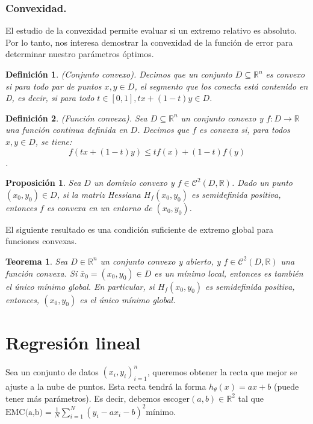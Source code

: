 \documentclass[a4paper,11pt]{article}
\newtheorem{theorem}{Teorema}
\newtheorem{proposition}{Proposición}
\newtheorem{definition}{Definición}
\begin{document}
\subsubsection{Convexidad.}

El estudio de la convexidad permite evaluar si un extremo relativo es absoluto. Por lo tanto, nos interesa demostrar la convexidad de la función de error para determinar nuestro parámetros óptimos.\\

\noindent
\begin{definition}(Conjunto convexo). Decimos que un conjunto $D\subseteq \mathbb{R}^n$
es convexo si para todo par de puntos $x,y \in D$, el segmento que los conecta está contenido en D, es decir, si para todo $t\in[0,1],tx+(1-t)y\in D$.
\end{definition}
\begin{definition} (Función convexa). Sea $D\subseteq \mathbb{R}^n$ un conjunto convexo y $f: D\rightarrow \mathbb{R}$ una función continua definida en $D$. Decimos que $f$ es convexa si, para todos $x,y\in D$, se tiene:
\[
f(tx+(1-t)y) \leq tf(x)+(1-t)f(y)
\].
\end{definition}

\begin{proposition}
Sea $D$ un dominio convexo y $f\in\mathcal{C}^2(D,\mathbb{R})$. Dado un punto
$(x_0, y_0) \in D$, si la matriz Hessiana $H_f (x_0, y_0)$ es semidefinida positiva, entonces
$f$ es convexa en un entorno de $(x_0, y_0)$.
\end{proposition}
\noindent
El siguiente resultado es una condición suficiente de extremo global para funciones convexas.
\begin{theorem}
Sea $D\in\mathbb{R}^n$ un conjunto convexo y abierto, y $f\in\mathcal{C}^2(D,\mathbb{R})$ una función convexa. Si $\overline{x}_0=(x_0,y_0)\in D$ es un mínimo local, entonces es también el único mínimo global. En particular, si $H_f(x_0,y_0)$ es semidefinida positiva, entonces, $(x_0,y_0)$ es el único mínimo global.
\end{theorem}
\newpage
\section{Regresión lineal}

Sea un conjunto de datos $(x_i,y_i)^n_{i=1}$, queremos obtener la recta que mejor se ajuste a la nube de puntos. Esta recta tendrá la forma $h_\theta(x)= ax+b$ (puede tener  más parámetros). Es decir, debemos escoger$  (a,b)\in \mathbb{R}^2 $ tal que $\text{EMC(a,b)} = \frac{1}{N} \sum_{i=1}^{N}(y_{i}-ax_{i}-b)^2 \text{mínimo.} $
\end{document}
